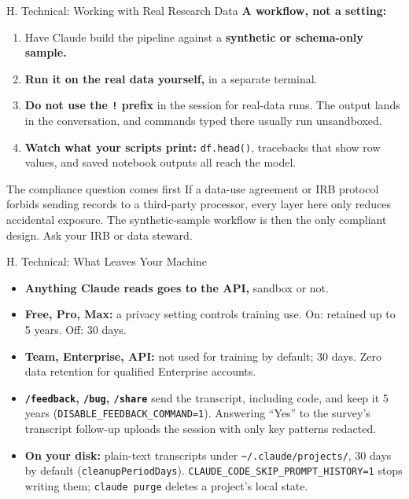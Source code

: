 \documentclass[aspectratio=169, 11pt]{beamer}
\begin{document}
\begin{frame}{H. Technical: Working with Real Research Data}
  \textbf{A workflow, not a setting:}
  \begin{enumerate}
    \item Have Claude build the pipeline against a \textbf{synthetic or schema-only sample.}
    \item \textbf{Run it on the real data yourself,} in a separate terminal.
    \item \textbf{Do not use the \texttt{!} prefix} in the session for real-data runs. The output lands in the conversation, and commands typed there usually run unsandboxed.
    \item \textbf{Watch what your scripts print:} \texttt{df.head()}, tracebacks that show row values, and saved notebook outputs all reach the model.
  \end{enumerate}

  \vspace{0.6em}
  \begin{alertblock}{The compliance question comes first}
    If a data-use agreement or IRB protocol forbids sending records to a third-party processor, every layer here only reduces accidental exposure. The synthetic-sample workflow is then the only compliant design. Ask your IRB or data steward.
  \end{alertblock}
\end{frame}

\begin{frame}{H. Technical: What Leaves Your Machine}
  \small
  \begin{itemize}
    \item \textbf{Anything Claude reads goes to the API,} sandbox or not.
    \item \textbf{Free, Pro, Max:} a privacy setting controls training use. On: retained up to 5 years. Off: 30 days.
    \item \textbf{Team, Enterprise, API:} not used for training by default; 30 days. Zero data retention for qualified Enterprise accounts.
    \item \textbf{\texttt{/feedback}, \texttt{/bug}, \texttt{/share}} send the transcript, including code, and keep it 5 years (\texttt{DISABLE\_FEEDBACK\_COMMAND=1}). Answering ``Yes'' to the survey's transcript follow-up uploads the session with only key patterns redacted.
    \item \textbf{On your disk:} plain-text transcripts under \texttt{\textasciitilde/.claude/projects/}, 30 days by default (\texttt{cleanupPeriodDays}). \texttt{CLAUDE\_CODE\_SKIP\_PROMPT\_HISTORY=1} stops writing them; \texttt{claude purge} deletes a project's local state.
  \end{itemize}
\end{frame}
\end{document}

